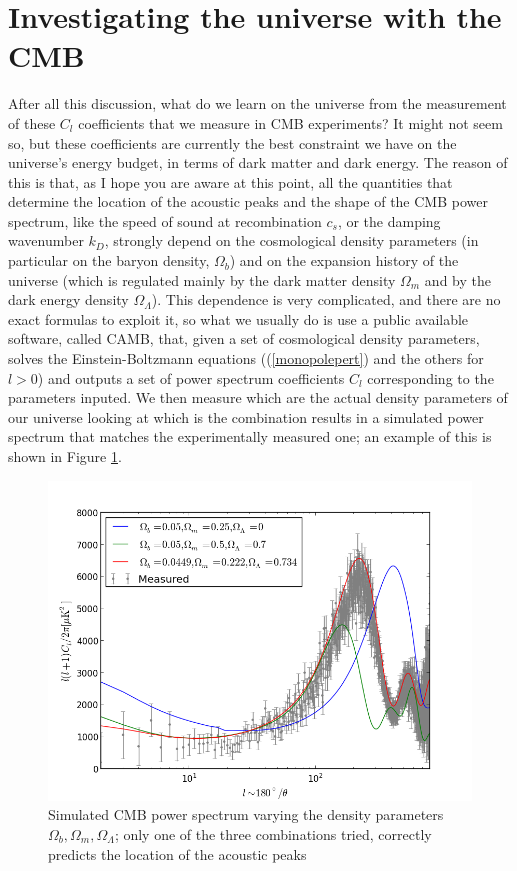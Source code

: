 \documentclass[11pt, a4paper,oneside,openright]{book}
\numberwithin{equation}{section}
\begin{document}
\section{Investigating the universe with the CMB}
After all this discussion, what do we learn on the universe from the measurement of these $C_l$ coefficients that we measure in CMB experiments? It might not seem so, but these coefficients are currently the best constraint we have on the universe's energy budget, in terms of dark matter and dark energy. The reason of this is that, as I hope you are aware at this point, all the quantities that determine the location of the acoustic peaks and the shape of the CMB power spectrum, like the speed of sound at recombination $c_s$, or the damping wavenumber $k_D$, strongly depend on the cosmological density parameters (in particular on the baryon density, $\Omega_b$) and on the expansion history of the universe (which is regulated mainly by the dark matter density $\Omega_m$ and by the dark energy density $\Omega_\Lambda$). This dependence is very complicated, and there are no exact formulas to exploit it, so what we usually do is use a public available software, called CAMB, that, given a set of cosmological 
density parameters, solves the Einstein-Boltzmann equations ((\ref{monopolepert}) and the others for $l>0$) and outputs a set of power spectrum coefficients $C_l$ corresponding to the parameters inputed. We then measure which are the actual density parameters of our universe looking at which is the combination results in a simulated power spectrum that matches the experimentally measured one; an example of this is shown in Figure \ref{simpow}.    
\begin{figure}
\begin{center}
\includegraphics[scale=0.7]{CMB/simulated.png}
\end{center}
\caption{Simulated CMB power spectrum varying the density parameters $\Omega_b,\Omega_m,\Omega_\Lambda$; only one of the three combinations tried, correctly predicts the location of the acoustic peaks}
\label{simpow}
\end{figure}
\end{document}
